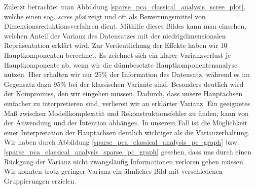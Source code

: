 Zuletzt betrachtet man Abbildung \ref{sparse_pca_classical_analysis_scree_plot}, welche einen sog. \textit{scree plot} zeigt und oft als Bewertungsmittel von Dimensionsreduktionsverfahren dient. Mithilfe dieses Bildes kann man einsehen, welchen Anteil der Varianz des Datensatzes mit der niedrigdimensionalen Repräsentation erklärt wird. Zur Verdeutlichung der Effekte haben wir $10$ Hauptkomponenten berechnet. Es zeichnet sich ein klarer Varianzverlust je Hauptkomponente ab, wenn wir die dünnbesetzte Hauptkomponentenanalyse nutzen. Hier erhalten wir nur $25$\% der Information des Datensatz, während  es im Gegensatz dazu $95$\% bei der klassischen Variante sind. Besonders deutlich wird der Kompromiss, den wir eingehen müssen. Dadurch, dass unsere Hauptachsen einfacher zu interpretieren sind, verlieren wir an erklärter Varianz. Ein geeignetes Maß zwischen Modellkomplexität und Rekonstruktionsfehler zu finden, kann von der Anwendung und der Intention abhängen. In unserem Fall ist die Möglichkeit einer Interpretation der Hauptachsen deutlich wichtiger als die Varianzerhaltung. Wir haben durch Abbildung \ref{sparse_pca_classical_analysis_pc_graph} bzw. \ref{sparse_pca_classical_analysis_sparse_pc_graph} gesehen, dass uns durch einen Rückgang der Varianz nicht zwangsläufig Informationen verloren gehen müssen. Wir konnten trotz geringer Varianz ein ähnliches Bild mit verschiedenen Gruppierungen erzielen.

